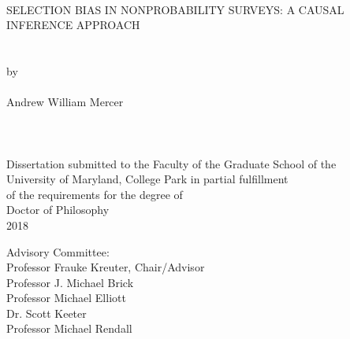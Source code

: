 
\thispagestyle{empty}
\hbox{\ }
\vspace{1in}
\renewcommand{\baselinestretch}{1}
\small\normalsize
\begin{center}

\large{{SELECTION BIAS IN NONPROBABILITY SURVEYS: A CAUSAL INFERENCE APPROACH}}\\
\ \\
\ \\
\large{by} \\
\ \\
\large{Andrew William Mercer}%
\ \\
\ \\
\ \\
\ \\
\normalsize
Dissertation submitted to the Faculty of the Graduate School of the \\
University of Maryland, College Park in partial fulfillment \\
of the requirements for the degree of \\
Doctor of Philosophy \\
2018
\end{center}

\vspace{7.5em}

\noindent Advisory Committee: \\
Professor Frauke Kreuter, Chair/Advisor \\
Professor J. Michael Brick\\
Professor Michael Elliott\\
Dr. Scott Keeter \\
Professor Michael Rendall
